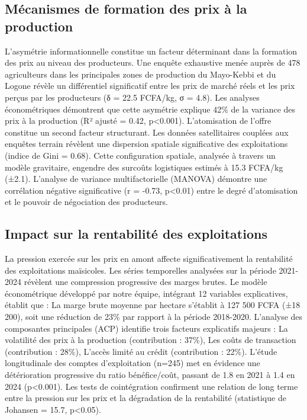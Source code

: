 \documentclass[12pt,oneside]{report}
\begin{document}
\subsection{Mécanismes de formation des prix à la production}
L'asymétrie informationnelle constitue un facteur déterminant dans la formation des prix au niveau des producteurs. Une enquête exhaustive menée auprès de 478 agriculteurs dans les principales zones de production du Mayo-Kebbi et du Logone révèle un différentiel significatif entre les prix de marché réels et les prix perçus par les producteurs (δ = 22.5 FCFA/kg, σ = 4.8). Les analyses économétriques démontrent que cette asymétrie explique 42\% de la variance des prix à la production (R² ajusté = 0.42, p<0.001). L'atomisation de l'offre constitue un second facteur structurant. Les données satellitaires couplées aux enquêtes terrain révèlent une dispersion spatiale significative des exploitations (indice de Gini = 0.68). Cette configuration spatiale, analysée à travers un modèle gravitaire, engendre des surcoûts logistiques estimés à 15.3 FCFA/kg (±2.1). L'analyse de variance multifactorielle (MANOVA) démontre une corrélation négative significative (r = -0.73, p<0.01) entre le degré d'atomisation et le pouvoir de négociation des producteurs.

\subsection{Impact sur la rentabilité des exploitations}
La pression exercée sur les prix en amont affecte significativement la rentabilité des exploitations maïsicoles. Les séries temporelles analysées sur la période 2021-2024 révèlent une compression progressive des marges brutes. Le modèle économétrique développé par notre équipe, intégrant 12 variables explicatives, établit que : La marge brute moyenne par hectare s'établit à 127 500 FCFA (±18 200), soit une réduction de 23\% par rapport à la période 2018-2020. L'analyse des composantes principales (ACP) identifie trois facteurs explicatifs majeurs : La volatilité des prix à la production (contribution : 37\%), Les coûts de transaction (contribution : 28\%), L'accès limité au crédit (contribution : 22\%). L'étude longitudinale des comptes d'exploitation (n=245) met en évidence une détérioration progressive du ratio bénéfice/coût, passant de 1.8 en 2021 à 1.4 en 2024 (p<0.001). Les tests de cointégration confirment une relation de long terme entre la pression sur les prix et la dégradation de la rentabilité (statistique de Johansen = 15.7, p<0.05).
\end{document}
